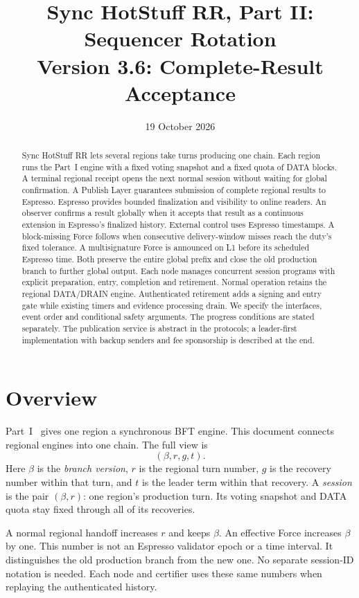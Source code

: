 \documentclass[11pt,a4paper]{article}
\title{Sync HotStuff RR, Part II: Sequencer Rotation\\\large Version 3.6: Complete-Result Acceptance}
\author{}\date{19 October 2026}
\newcommand{\defterm}[1]{\textcolor{rrBlue}{\textit{#1}}}
\newcounter{protocol}
\begin{document}
\maketitle
\begin{abstract}
Sync HotStuff RR lets several regions take turns producing one chain.
Each region runs the Part~I engine with a fixed voting snapshot and a
fixed quota of DATA blocks. A terminal regional receipt opens the next
normal session without waiting for global confirmation. A Publish Layer
guarantees submission of complete regional results to Espresso. Espresso
provides bounded finalization and visibility to online readers. An observer confirms a result
globally when it accepts that result as a continuous extension in
Espresso's finalized history. External control uses Espresso timestamps.
A block-missing Force follows when consecutive delivery-window misses
reach the duty's fixed tolerance. A multisignature Force is announced on L1 before its scheduled
Espresso time. Both preserve the entire global prefix and close the old
production branch to further global output. Each node manages concurrent session programs with explicit preparation,
entry, completion and retirement. Normal operation retains the regional
DATA/DRAIN engine. Authenticated retirement adds a signing and entry gate
while existing timers and evidence processing drain. We specify the
interfaces, event order and conditional safety arguments.
The progress conditions are stated separately. The publication service is
abstract in the protocols; a leader-first implementation with backup
senders and fee sponsorship is described at the end.
\end{abstract}

\section{Overview}
\label{sec:overview}
Part~I~\cite{part1} gives one region a synchronous BFT engine.
This document connects regional engines into one chain. The full view is
\[
 (\beta,r,g,t).
\]
Here $\beta$ is the \defterm{branch version}, $r$ is the regional turn
number, $g$ is the recovery number within that turn, and $t$ is the
leader term within that recovery. A \defterm{session} is the pair
$(\beta,r)$: one region's production turn. Its voting snapshot and DATA
quota stay fixed through all of its recoveries.

A normal regional handoff increases $r$ and keeps $\beta$.
An effective Force increases $\beta$ by one. This number is not an
Espresso validator epoch or a time interval. It distinguishes the old
production branch from the new one. No separate session-ID notation is
needed. Each node and certifier uses these same numbers when replaying
the authenticated history.
\end{document}
